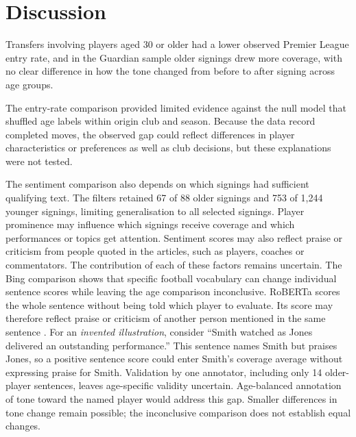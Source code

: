 \section*{Discussion}

Transfers involving players aged 30 or older had a lower observed Premier League entry rate, and in the Guardian sample older signings drew more coverage, with no clear difference in how the tone changed from before to after signing across age groups.

The entry-rate comparison provided limited evidence against the null model that shuffled age labels within origin club and season. Because the data record completed moves, the observed gap could reflect differences in player characteristics or preferences as well as club decisions, but these explanations were not tested. 

The sentiment comparison also depends on which signings had sufficient qualifying text. The filters retained 67 of 88 older signings and 753 of 1,244 younger signings, limiting generalisation to all selected signings. Player prominence may influence which signings receive coverage and which performances or topics get attention. Sentiment scores may also reflect praise or criticism from people quoted in the articles, such as players, coaches or commentators. The contribution of each of these factors remains uncertain. The Bing comparison shows that specific football vocabulary can change individual sentence scores while leaving the age comparison inconclusive. RoBERTa scores the whole sentence without being told which player to evaluate. Its score may therefore reflect praise or criticism of another person mentioned in the same sentence \cite{hamborg2021news}. For an \textit{invented illustration}, consider ``Smith watched as Jones delivered an outstanding performance.'' This sentence names Smith but praises Jones, so a positive sentence score could enter Smith's coverage average without expressing praise for Smith. Validation by one annotator, including only 14 older-player sentences, leaves age-specific validity uncertain. Age-balanced annotation of tone toward the named player would address this gap. Smaller differences in tone change remain possible; the inconclusive comparison does not establish equal changes.

